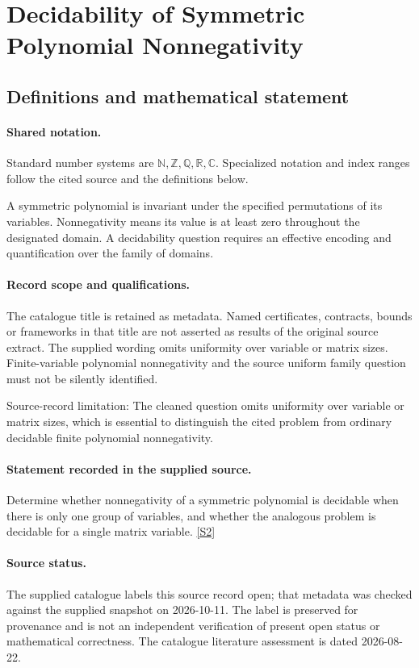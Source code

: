 \documentclass[11pt]{article}
\newcommand{\sref}[2]{\hyperlink{source:#1:#2}{[S#2]}}
\begin{document}
\section{Decidability of Symmetric Polynomial Nonnegativity}\label{statement}

\subsection{Definitions and mathematical statement}

\paragraph{Shared notation.}Standard number systems are $\mathbb N,\mathbb Z,\mathbb Q,\mathbb R,\mathbb C$. Specialized notation and index ranges follow the cited source and the definitions below.


A symmetric polynomial is invariant under the specified permutations of its variables. Nonnegativity means its value is at least zero throughout the designated domain. A decidability question requires an effective encoding and quantification over the family of domains.
\paragraph{Record scope and qualifications.}
The catalogue title is retained as metadata. Named certificates, contracts, bounds or frameworks in that title are not asserted as results of the original source extract.
The supplied wording omits uniformity over variable or matrix sizes. Finite-variable polynomial nonnegativity and the source uniform family question must not be silently identified.

Source-record limitation: The cleaned question omits uniformity over variable or matrix sizes, which is essential to distinguish the cited problem from ordinary decidable finite polynomial nonnegativity.
\paragraph{Statement recorded in the supplied source.}
Determine whether nonnegativity of a symmetric polynomial is decidable when there is only one group of variables, and whether the analogous problem is decidable for a single matrix variable. \sref{statement}{2}
\paragraph{Source status.}
The supplied catalogue labels this source record open; that metadata was checked against the supplied snapshot on 2026-10-11. The label is preserved for provenance and is not an independent verification of present open status or mathematical correctness. The catalogue literature assessment is dated 2026-08-22.
\end{document}
